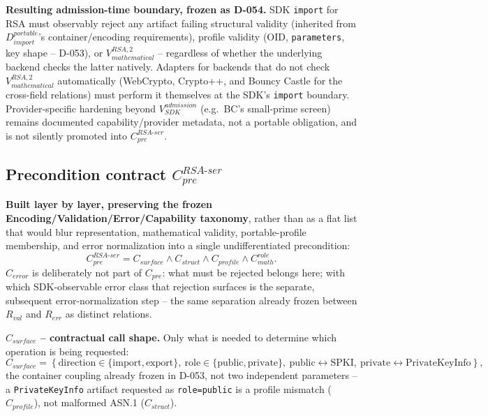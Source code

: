 \documentclass[11pt,a4paper]{article}
\begin{document}
\textbf{Resulting admission-time boundary, frozen as D-054.} SDK \texttt{import} for RSA must observably reject any artifact failing structural validity (inherited from $D_{import}^{portable}$'s container/encoding requirements), profile validity ($\mathrm{OID}$, \texttt{parameters}, key shape -- D-053), or $V_{mathematical}^{RSA,2}$ -- regardless of whether the underlying backend checks the latter natively. Adapters for backends that do not check $V_{mathematical}^{RSA,2}$ automatically (WebCrypto, Crypto++, and Bouncy Castle for the cross-field relations) must perform it themselves at the SDK's \texttt{import} boundary. Provider-specific hardening beyond $V^{admission}_{SDK}$ (e.g.\ BC's small-prime screen) remains documented capability/provider metadata, not a portable obligation, and is not silently promoted into $C_{pre}^{RSA\text{-}ser}$.

\subsection{Precondition contract \texorpdfstring{$C_{pre}^{RSA\text{-}ser}$}{C\_pre RSA-ser}}\label{sec:rsa-ser-cpre}

\textbf{Built layer by layer, preserving the frozen Encoding/Validation/Error/Capability taxonomy}, rather than as a flat list that would blur representation, mathematical validity, portable-profile membership, and error normalization into a single undifferentiated precondition:
\[
C_{pre}^{RSA\text{-}ser} = C_{surface} \wedge C_{struct} \wedge C_{profile} \wedge C_{math}^{role}.
\]
$C_{error}$ is deliberately not part of $C_{pre}$: what must be rejected belongs here; with which SDK-observable error class that rejection surfaces is the separate, subsequent error-normalization step -- the same separation already frozen between $R_{val}$ and $R_{err}$ as distinct relations.

\textbf{$C_{surface}$ -- contractual call shape.} Only what is needed to determine which operation is being requested:
\[
C_{surface} = \left\{\text{direction}\in\{\text{import},\text{export}\},\ \text{role}\in\{\text{public},\text{private}\},\ \text{public}\leftrightarrow\text{SPKI},\ \text{private}\leftrightarrow\text{PrivateKeyInfo}\right\},
\]
the container coupling already frozen in D-053, not two independent parameters -- a \texttt{PrivateKeyInfo} artifact requested as \texttt{role=public} is a profile mismatch ($C_{profile}$), not malformed ASN.1 ($C_{struct}$).
\end{document}
